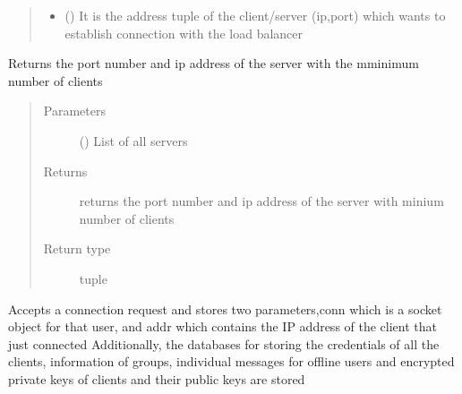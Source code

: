 \documentclass[letterpaper,10pt,english]{sphinxmanual}
\begin{document}
\begin{fulllineitems}
\begin{quote}
\begin{description}
\begin{itemize}
\item {} 
\sphinxAtStartPar
{} () \textendash{} It is the address tuple of the client/server (ip,port) which wants to establish connection with the load balancer

\end{itemize}

\end{description}\end{quote}

\end{fulllineitems}


\begin{fulllineitems}
\label{\detokenize{loadbalancer:loadbalancer.least_connection}}
\sphinxAtStartPar
Returns the port number and ip address of the server with the mminimum number of clients
\begin{quote}\begin{description}
\item[{Parameters}] \leavevmode
\sphinxAtStartPar
{} (\sphinxstyleliteralemphasis{\sphinxupquote{{[}}}\sphinxstyleliteralemphasis{\sphinxupquote{{]}}}) \textendash{} List of all servers

\item[{Returns}] \leavevmode
\sphinxAtStartPar
returns the port number and ip address of the server with minium number of clients

\item[{Return type}] \leavevmode
\sphinxAtStartPar
tuple

\end{description}\end{quote}

\end{fulllineitems}


\begin{fulllineitems}
\label{\detokenize{loadbalancer:loadbalancer.main}}
\sphinxAtStartPar
Accepts a connection request and stores two parameters,conn which is a socket object for that user, and addr which contains the IP address of the client that just connected
Additionally, the databases for storing the credentials of all the clients, information of groups, individual messages for offline users and encrypted private keys of clients and their public keys are stored

\end{fulllineitems}
\end{document}
